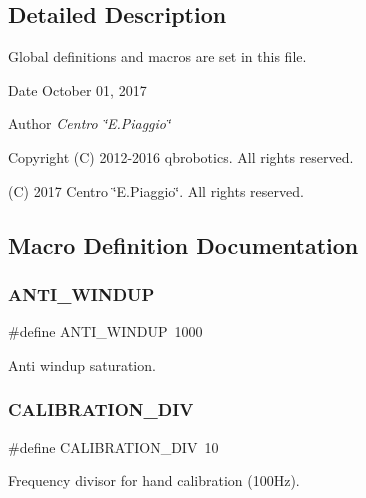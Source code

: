 \subsection{Detailed Description}
Global definitions and macros are set in this file. 

\begin{DoxyDate}{Date}
October 01, 2017 
\end{DoxyDate}
\begin{DoxyAuthor}{Author}
{\itshape Centro \char`\"{}\+E.\+Piaggio\char`\"{}} 
\end{DoxyAuthor}
\begin{DoxyCopyright}{Copyright}
(C) 2012-\/2016 qbrobotics. All rights reserved. 

(C) 2017 Centro \char`\"{}\+E.\+Piaggio\char`\"{}. All rights reserved. 
\end{DoxyCopyright}


\subsection{Macro Definition Documentation}
\mbox{\label{globals_8h_a66edaed675ab232f06a4e5b3c30d101a}} 
\subsubsection{A\+N\+T\+I\+\_\+\+W\+I\+N\+D\+UP}
{\footnotesize\ttfamily \#define A\+N\+T\+I\+\_\+\+W\+I\+N\+D\+UP~1000}

Anti windup saturation. \mbox{\label{globals_8h_a80db2dce057c92400a7fb1678bc0b0a8}} 
\subsubsection{C\+A\+L\+I\+B\+R\+A\+T\+I\+O\+N\+\_\+\+D\+IV}
{\footnotesize\ttfamily \#define C\+A\+L\+I\+B\+R\+A\+T\+I\+O\+N\+\_\+\+D\+IV~10}

Frequency divisor for hand calibration (100\+Hz). \mbox{\label{globals_8h_a8b3493add1a9aac8207ec34774237928}} 
